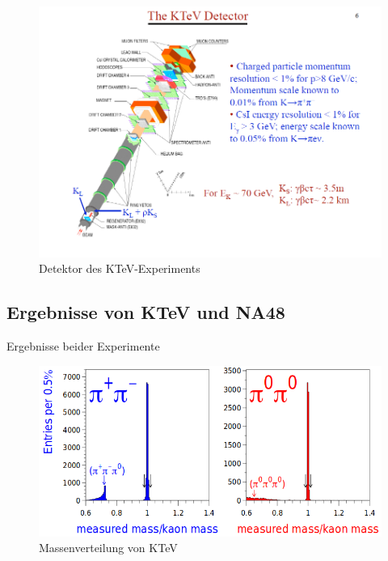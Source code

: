 \documentclass[aspectratio=1610, professionalfonts, 9pt, t]{beamer}
\begin{document}
  \begin{frame}
    \begin{figure}[ht]
      \includegraphics[height=0.8\textheight]{Images/KTEVDETEKTOR.png}
      \caption{Detektor des KTeV-Experiments}
    \end{figure}
  \end{frame}

  \subsection{Ergebnisse von KTeV und NA48}

  \begin{frame}{Ergebnisse beider Experimente}
    \begin{figure}
      \includegraphics[height=0.8\textheight]{Images/ktevdata.png}
      \caption{Massenverteilung von KTeV}
    \end{figure}
  \end{frame}
\end{document}
